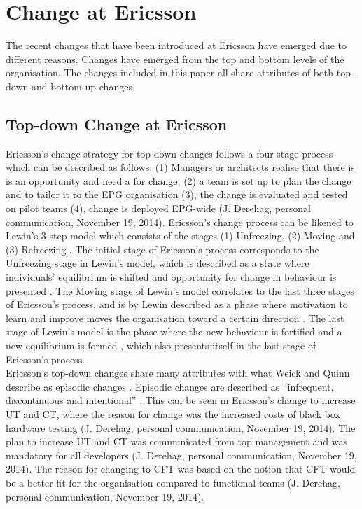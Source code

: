\documentclass[final_report_innit.tex]{subfiles}
\begin{document}
\section{Change at Ericsson}
The recent changes that have been introduced at Ericsson have emerged due to different reasons. Changes have emerged from the top and bottom levels of the organisation. The changes included in this paper all share attributes of both top-down and bottom-up changes. 

\subsection{Top-down Change at Ericsson}
Ericsson’s change strategy for top-down changes follows a four-stage process which can be described as follows: (1) Managers or architects realise that there is is an opportunity and need a for change, (2) a team is set up to plan the change and to tailor it to the EPG organisation (3), the change is evaluated and tested on pilot teams (4), change is deployed EPG-wide (J. Derehag, personal communication, November 19, 2014). Ericsson’s change process can be likened to Lewin’s 3-step model which consists of the stages (1) Unfreezing, (2) Moving and (3) Refreezing \cite{burnes2004kurt}. The initial stage of Ericsson’s process corresponds to the Unfreezing stage in Lewin’s model, which is described as a state where individuals’ equilibrium is shifted and opportunity for change in behaviour is presented \cite{burnes2004kurt}. The Moving stage of Lewin’s model correlates to the last three stages of Ericsson's process, and is by Lewin described as a phase where motivation to learn and improve moves the organisation toward a certain direction \cite{burnes2004kurt}. The last stage of Lewin’s model is the phase where the new behaviour is fortified and a new equilibrium is formed \cite{burnes2004kurt}, which also presents itself in the last stage of Ericsson’s process. 
\\

Ericsson’s top-down changes share many attributes with what Weick and Quinn describe as episodic changes \cite{weick1999organizational}. Episodic changes are described as “infrequent, discontinuous and intentional” \cite{weick1999organizational}. This can be seen in Ericsson’s change to increase UT and CT, where the reason for change was the increased costs of black box hardware testing (J. Derehag, personal communication, November 19, 2014). The plan to increase UT and CT was communicated from top management and was mandatory for all developers (J. Derehag, personal communication, November 19, 2014). The reason for changing to CFT was based on the notion that CFT would be a better fit for the organisation compared to functional teams (J. Derehag, personal communication, November 19, 2014). 
\\
\end{document}
